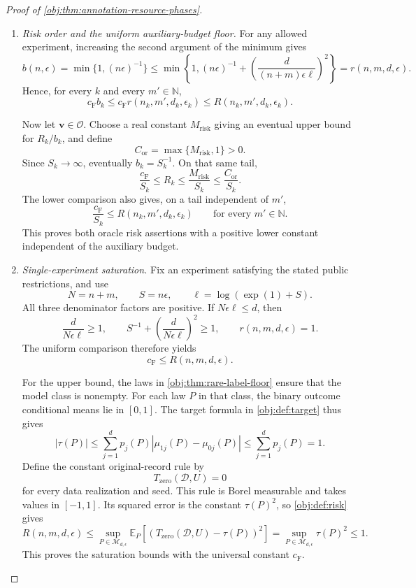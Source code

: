 \documentclass[11pt]{article}
\begin{document}
\begin{proof}[Proof of \cref{obj:thm:annotation-resource-phases}]
\begin{enumerate}
\item \emph{Risk order and the uniform auxiliary-budget floor.}
For any allowed experiment, increasing the second argument of the minimum gives
\[
b(n,\epsilon)
=\min\{1,(n\epsilon)^{-1}\}
\le
\min\left\{1,(n\epsilon)^{-1}
+\left(\frac{d}{(n+m)\epsilon\ell}\right)^2\right\}
=r(n,m,d,\epsilon).
\]
Hence, for every \(k\) and every \(m'\in\mathbb N\),
\[
c_{\mathrm F}b_k
\le c_{\mathrm F}r(n_k,m',d_k,\epsilon_k)
\le R(n_k,m',d_k,\epsilon_k).
\]

Now let \(\mathbf v\in\mathcal O\). Choose a real constant
\(M_{\mathrm{risk}}\) giving an eventual upper bound for \(R_k/b_k\), and define
\[
C_{\mathrm{or}}=\max\{M_{\mathrm{risk}},1\}>0.
\]
Since \(S_k\to\infty\), eventually \(b_k=S_k^{-1}\). On that same tail,
\[
\frac{c_{\mathrm F}}{S_k}\le R_k
\le\frac{M_{\mathrm{risk}}}{S_k}
\le\frac{C_{\mathrm{or}}}{S_k}.
\]
The lower comparison also gives, on a tail independent of \(m'\),
\[
\frac{c_{\mathrm F}}{S_k}
\le R(n_k,m',d_k,\epsilon_k)
\qquad\text{for every }m'\in\mathbb N.
\]
This proves both oracle risk assertions with a positive lower constant independent of the auxiliary budget.

\item \emph{Single-experiment saturation.}
Fix an experiment satisfying the stated public restrictions, and use
\[
N=n+m,\qquad
S=n\epsilon,\qquad
\ell=\log(\exp(1)+S).
\]
All three denominator factors are positive. If \(N\epsilon\ell\le d\), then
\[
\frac{d}{N\epsilon\ell}\ge1,
\qquad
S^{-1}+\left(\frac{d}{N\epsilon\ell}\right)^2\ge1,
\qquad
r(n,m,d,\epsilon)=1.
\]
The uniform comparison therefore yields
\[
c_{\mathrm F}\le R(n,m,d,\epsilon).
\]

For the upper bound, the laws in
\cref{obj:thm:rare-label-floor} ensure that the model class is nonempty. For each law \(P\) in that class, the binary outcome conditional means lie in \([0,1]\). The target formula in \cref{obj:def:target} thus gives
\[
|\tau(P)|
\le\sum_{j=1}^{d}p_j(P)
       |\mu_{1j}(P)-\mu_{0j}(P)|
\le\sum_{j=1}^{d}p_j(P)=1.
\]
Define the constant original-record rule by
\[
T_{\mathrm{zero}}(\mathcal D,U)=0
\]
for every data realization and seed. This rule is Borel measurable and takes values in \([-1,1]\). Its squared error is the constant \(\tau(P)^2\), so \cref{obj:def:risk} gives
\[
R(n,m,d,\epsilon)
\le
\sup_{P\in\mathcal M_{d,\epsilon}}
\mathbb E_P\!\left[
(T_{\mathrm{zero}}(\mathcal D,U)-\tau(P))^2
\right]
=
\sup_{P\in\mathcal M_{d,\epsilon}}\tau(P)^2
\le1.
\]
This proves the saturation bounds with the universal constant \(c_{\mathrm F}\).


\end{enumerate}
\end{proof}
\end{document}
